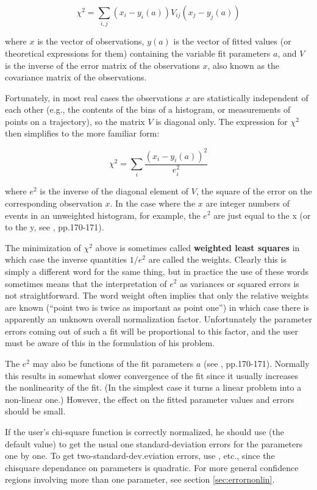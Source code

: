 \[ \chi^2 = \sum_{i,j} (x_i - y_i(a)) V_{ij} (x_j - y_j(a)) \]
 
where $x$ is the vector of observations, $y(a)$ is the vector of fitted 
values (or theoretical expressions for them) containing the variable 
fit parameters $a$, and $V$ is the inverse of the error matrix of the 
observations $x$, also known as the covariance matrix of the 
observations.
 
Fortunately, in most real cases the observations $x$ are statistically 
independent of each other (e.g., the contents of the bins of a 
histogram, or measurements of points on a trajectory), so the 
matrix $V$ is diagonal only. The expression for $\chi^2$ then simplifies to 
the more familiar form:
 
\[ \chi^2 = \sum_{i} \frac{(x_i - y_i(a))^2}{e_i^2} \]
 
where $e^2$ is the inverse of the diagonal element of $V$, the square of 
the error on the corresponding observation $x$. In the case where the $x$
are integer numbers of events in an unweighted histogram, for 
example, the $e^2$ are just equal to the x (or to the y, see \cite{bib-EADIE},
pp.170-171).
 
The minimization of $\chi^2$ above is sometimes called {\bf weighted least 
%
%
squares} in which case the inverse quantities $1/e^2$ are called the weights. 
Clearly this is simply a different word for the same thing, 
but in practice the use of these words sometimes means that the 
interpretation of $e^2$ as variances or squared errors is not 
straightforward. The word weight often implies that only the 
relative weights are known (``point two is twice as important as 
point one'') in which case there is apparently an unknown overall 
normalization factor. Unfortunately the parameter errors coming out 
of such a fit will be proportional to this factor, and the user must be 
aware of this in the formulation of his problem.
                                                                                               
The $e^2$ may also be functions of the fit parameters $a$ (see \cite{bib-EADIE},
pp.170-171). Normally this results in somewhat slower convergence 
of the fit since it usually increases the nonlinearity of the fit. (In 
the simplest case it turns a linear problem into a non-linear one.) 
However, the effect on the fitted parameter values and errors should 
be small.
 
If the user's chi-square function is correctly normalized, he should 
use  (the default value) to get the usual 
one standard-deviation errors for the parameters one by one. 
To get two-standard-dev.eviation
errors, use , etc., 
since the chisquare dependance on 
parameters is quadratic. For more general confidence regions 
involving more than one parameter, see section \ref{sec:errornonlin}.
 
